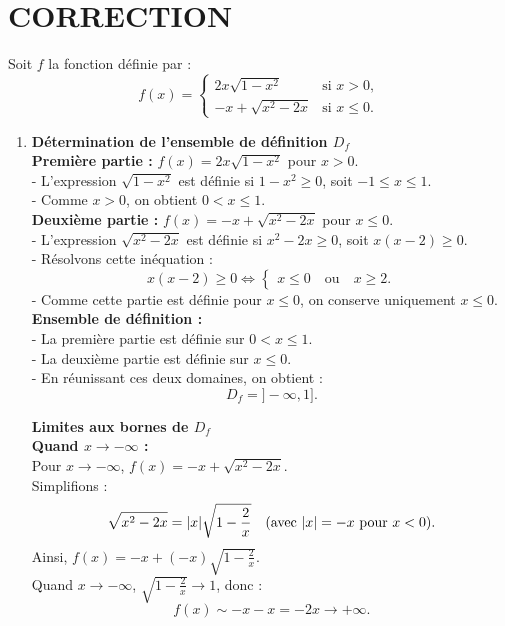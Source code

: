 \documentclass{article}
\begin{document}
\section*{CORRECTION}
Soit \( f \) la fonction définie par :
\[
f(x) =
\begin{cases} 
2x\sqrt{1 - x^2} & \text{si } x > 0, \\ 
-x + \sqrt{x^2 - 2x} & \text{si } x \leq 0.
\end{cases}
\]

\begin{enumerate}
    \item \textbf{Détermination de l'ensemble de définition \( D_f \)} \\
    \textbf{Première partie :} \( f(x) = 2x\sqrt{1 - x^2} \) pour \( x > 0 \). \\
    - L'expression \( \sqrt{1 - x^2} \) est définie si \( 1 - x^2 \geq 0 \), soit \( -1 \leq x \leq 1 \). \\
    - Comme \( x > 0 \), on obtient \( 0 < x \leq 1 \). \\

    \textbf{Deuxième partie :} \( f(x) = -x + \sqrt{x^2 - 2x} \) pour \( x \leq 0 \). \\
    - L'expression \( \sqrt{x^2 - 2x} \) est définie si \( x^2 - 2x \geq 0 \), soit \( x(x - 2) \geq 0 \). \\
    - Résolvons cette inéquation :
    \[
    x(x - 2) \geq 0 \iff
    \begin{cases} 
    x \leq 0 \quad \text{ou} \quad x \geq 2.
    \end{cases}
    \]
    - Comme cette partie est définie pour \( x \leq 0 \), on conserve uniquement \( x \leq 0 \). \\

    \textbf{Ensemble de définition :} \\
    - La première partie est définie sur \( 0 < x \leq 1 \). \\
    - La deuxième partie est définie sur \( x \leq 0 \). \\
    - En réunissant ces deux domaines, on obtient :
    \[
    D_f = ]-\infty, 1].
    \]
    
   \textbf{Limites aux bornes de \( D_f \)} \\

    \textbf{Quand \( x \to -\infty \) :} \\
    Pour \( x \to -\infty \), \( f(x) = -x + \sqrt{x^2 - 2x} \). \\
    Simplifions :
    \[
    \sqrt{x^2 - 2x} = |x| \sqrt{1 - \frac{2}{x}} \quad \text{(avec \( |x| = -x \) pour \( x < 0 \))}.
    \]
    Ainsi, \( f(x) = -x + (-x)\sqrt{1 - \frac{2}{x}} \). \\
    Quand \( x \to -\infty \), \( \sqrt{1 - \frac{2}{x}} \to 1 \), donc :
    \[
    f(x) \sim -x - x = -2x \to +\infty.
    \]


\end{enumerate}
\end{document}
